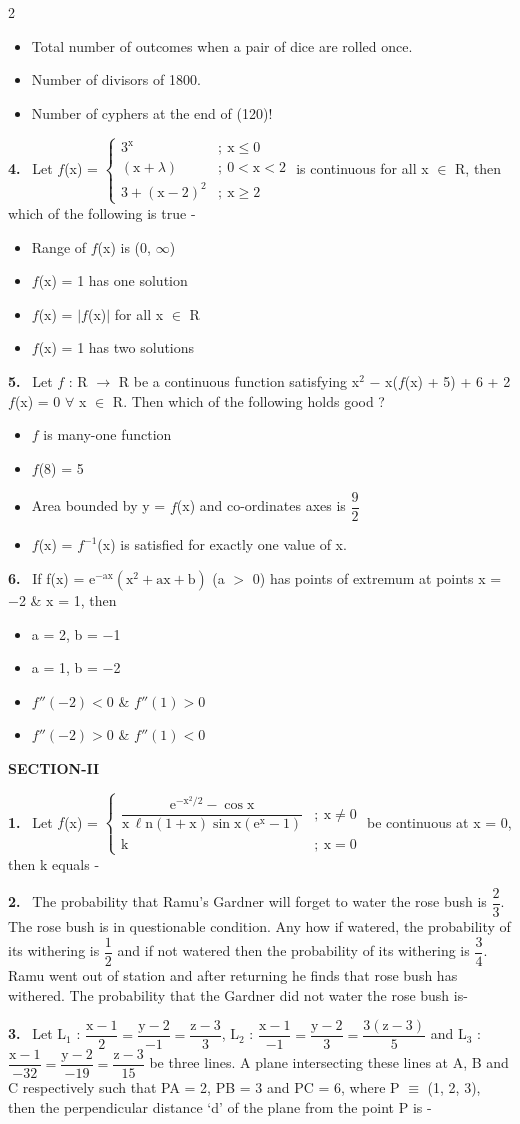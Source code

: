 \documentclass[10pt]{extarticle}
\newcommand{\sect}[1]{\par\smallskip\noindent\textbf{#1}\par}
\newcommand{\qn}[1]{\par\smallskip\noindent\textbf{#1.}~}
\newenvironment{qoptions}{\begin{itemize}[leftmargin=1.8em,itemsep=1pt,topsep=2pt,label={}]}{\end{itemize}}
\newcommand{\opt}[2]{\item[(#1)] #2}
\begin{document}
\begin{multicols}{2}
\begin{qoptions}
\opt{B}{Total number of outcomes when a pair of dice are rolled once.}
\opt{C}{Number of divisors of 1800.}
\opt{D}{Number of cyphers at the end of (120)!}
\end{qoptions}
\qn{4} Let $f$(x) = $\begin{cases}3^\text{x} & ;\ \text{x}\leq0\\ (\text{x}+\lambda) & ;\ 0<\text{x}<2\\ 3+(\text{x}-2)^2 & ;\ \text{x}\geq2\end{cases}$ is continuous for all x $\in$ R, then which of the following is true -
\begin{qoptions}
\opt{A}{Range of $f$(x) is (0, $\infty$)}
\opt{B}{$f$(x) = 1 has one solution}
\opt{C}{$f$(x) = $|f$(x)$|$ for all x $\in$ R}
\opt{D}{$f$(x) = 1 has two solutions}
\end{qoptions}
\qn{5} Let $f$ : R $\to$ R be a continuous function satisfying x$^2$ $-$ x($f$(x) + 5) + 6 + 2$f$(x) = 0 $\forall$ x $\in$ R. Then which of the following holds good ?
\begin{qoptions}
\opt{A}{$f$ is many-one function}
\opt{B}{$f$(8) = 5}
\opt{C}{Area bounded by y = $f$(x) and co-ordinates axes is $\dfrac{9}{2}$}
\opt{D}{$f$(x) = $f^{-1}$(x) is satisfied for exactly one value of x.}
\end{qoptions}
\qn{6} If f(x) = e$^{-\text{ax}}\left(\text{x}^2+\text{ax}+\text{b}\right)$ (a $>$ 0) has points of extremum at points x = $-$2 \& x = 1, then
\begin{qoptions}
\opt{A}{a = 2, b = $-$1}
\opt{B}{a = 1, b = $-$2}
\opt{C}{$f''(-2)<0$ \& $f''(1)>0$}
\opt{D}{$f''(-2)>0$ \& $f''(1)<0$}
\end{qoptions}
\sect{SECTION-II}
\qn{1} Let $f$(x) = $\begin{cases}\dfrac{\text{e}^{-\text{x}^2/2}-\cos\text{x}}{\text{x}\,\ell\text{n}(1+\text{x})\sin\text{x}(\text{e}^\text{x}-1)} & ;\ \text{x}\neq0\\[1.5ex] \text{k} & ;\ \text{x}=0\end{cases}$ be continuous at x = 0, then k equals -
\qn{2} The probability that Ramu's Gardner will forget to water the rose bush is $\dfrac{2}{3}$. The rose bush is in questionable condition. Any how if watered, the probability of its withering is $\dfrac{1}{2}$ and if not watered then the probability of its withering is $\dfrac{3}{4}$. Ramu went out of station and after returning he finds that rose bush has withered. The probability that the Gardner did not water the rose bush is-
\qn{3} Let L$_1$ : $\dfrac{\text{x}-1}{2}=\dfrac{\text{y}-2}{-1}=\dfrac{\text{z}-3}{3}$, L$_2$ : $\dfrac{\text{x}-1}{-1}=\dfrac{\text{y}-2}{3}=\dfrac{3(\text{z}-3)}{5}$ and L$_3$ : $\dfrac{\text{x}-1}{-32}=\dfrac{\text{y}-2}{-19}=\dfrac{\text{z}-3}{15}$ be three lines. A plane intersecting these lines at A, B and C respectively such that PA = 2, PB = 3 and PC = 6, where P $\equiv$ (1, 2, 3), then the perpendicular distance `d' of the plane from the point P is -

\end{multicols}
\end{document}
